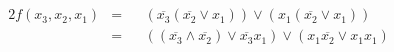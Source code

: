 \documentclass[10pt,a4paper,oneside,ngerman,numbers=noenddot]{scrartcl}
\begin{document}
\subsection{} %
\begin{alignat*}{2}
f(x_{3}, x_{2}, x_{1}) &=&& (\overline{x_{3}}(\overline{x_{2}} \vee x_{1})) \vee (x_{1}(\overline{x_{2}} \vee x_{1})) \\
&=&& ((\overline{x_{3}} \wedge \overline{x_{2}}) \vee \overline{x_{3}}x_{1}) \vee (x_{1}\overline{x_{2}} \vee x_{1}x_{1})
%
%
\end{alignat*}
\end{document}
